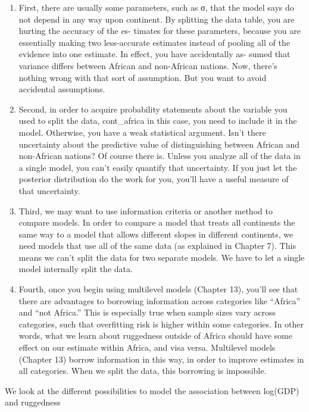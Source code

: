 \documentclass[
]{article}
\begin{document}
\begin{enumerate}
\def\labelenumi{\arabic{enumi}.}
\item
  First, there are usually some parameters, such as σ, that the model
  says do not depend in any way upon continent. By splitting the data
  table, you are hurting the accuracy of the es- timates for these
  parameters, because you are essentially making two less-accurate
  estimates instead of pooling all of the evidence into one estimate. In
  effect, you have accidentally as- sumed that variance differs between
  African and non-African nations. Now, there's nothing wrong with that
  sort of assumption. But you want to avoid accidental assumptions.
\item
  Second, in order to acquire probability statements about the variable
  you used to split the data, cont\_africa in this case, you need to
  include it in the model. Otherwise, you have a weak statistical
  argument. Isn't there uncertainty about the predictive value of
  distinguishing between African and non-African nations? Of course
  there is. Unless you analyze all of the data in a single model, you
  can't easily quantify that uncertainty. If you just let the posterior
  distribution do the work for you, you'll have a useful measure of that
  uncertainty.
\item
  Third, we may want to use information criteria or another method to
  compare models. In order to compare a model that treats all continents
  the same way to a model that allows different slopes in different
  continents, we need models that use all of the same data (as explained
  in Chapter 7). This means we can't split the data for two separate
  models. We have to let a single model internally split the data.
\item
  Fourth, once you begin using multilevel models (Chapter 13), you'll
  see that there are advantages to borrowing information across
  categories like ``Africa'' and ``not Africa.'' This is especially true
  when sample sizes vary across categories, such that overfitting risk
  is higher within some categories. In other words, what we learn about
  ruggedness outside of Africa should have some effect on our estimate
  within Africa, and visa versa. Multilevel models (Chapter 13) borrow
  information in this way, in order to improve estimates in all
  categories. When we split the data, this borrowing is impossible.
\end{enumerate}

We look at the different possibilities to model the association between
log(GDP) and ruggedness
\end{document}
